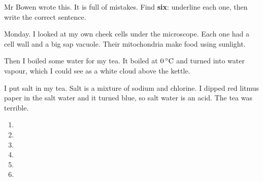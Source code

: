 \documentclass[12pt,a4paper]{article}
\newif\ifkey
\begin{document}
\noindent
\begin{minipage}{\textwidth}
Mr Bowen wrote this. It is full of mistakes. Find \textbf{six}: underline each
one, then write the correct sentence.

\vspace{6pt}
\begin{tcolorbox}[enhanced, colback=black!3, colframe=black!35, boxrule=0.8pt,
                  arc=4pt, left=10pt, right=10pt, top=8pt, bottom=8pt]
  \linespread{1.35}\selectfont
  Monday. I looked at my own cheek cells under the microscope. Each one had a cell
  wall and a big sap vacuole. Their mitochondria make food using sunlight.

  Then I boiled some water for my tea. It boiled at $0\,^{\circ}\mathrm{C}$ and turned into water
  vapour, which I could see as a white cloud above the kettle.

  I put salt in my tea. Salt is a mixture of sodium and chlorine. I dipped red
  litmus paper in the salt water and it turned blue, so salt water is an acid.
  The tea was terrible.
\end{tcolorbox}

\vspace{2pt}
\begin{enumerate}[label=\arabic*., itemsep=24pt, topsep=14pt]
  \item {\color{rulegray}\hrulefill}
  \item {\color{rulegray}\hrulefill}
  \item {\color{rulegray}\hrulefill}
  \item {\color{rulegray}\hrulefill}
  \item {\color{rulegray}\hrulefill}
  \item {\color{rulegray}\hrulefill}
\end{enumerate}
\end{minipage}

\ifkey
\newpage
{}

\linespread{1.0}\selectfont
{}

\end{document}
